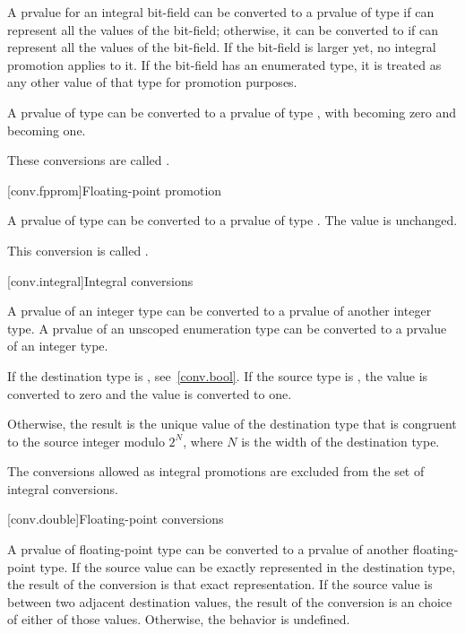 \pnum
A prvalue for an integral bit-field can be converted
to a prvalue of type  if  can represent all the
values of the bit-field; otherwise, it can be converted to
 if  can represent all the
values of the bit-field. If the bit-field is larger yet, no integral
promotion applies to it. If the bit-field has an enumerated type, it is
treated as any other value of that type for promotion purposes.

\pnum
{}%
A prvalue of type  can be converted to a prvalue of type
, with  becoming zero and  becoming
one.

\pnum
These conversions are called .

[conv.fpprom]{Floating-point promotion}

\pnum
{}%
A prvalue of type  can be converted to a prvalue of type
. The value is unchanged.

\pnum
This conversion is called .

[conv.integral]{Integral conversions}

\pnum
{}%
A prvalue of an integer type can be converted to a prvalue of another
integer type. A prvalue of an unscoped enumeration type can be converted to
a prvalue of an integer type.

\pnum
{}%
If the destination type is , see~\ref{conv.bool}. If the
source type is , the value  is converted to
zero and the value  is converted to one.

\pnum
{}%
%
Otherwise, the result is the unique value of the destination type
that is congruent to the source integer modulo $2^N$,
where $N$ is the width of the destination type.

\pnum
The conversions allowed as integral promotions are excluded from the set
of integral conversions.

[conv.double]{Floating-point conversions}

\pnum
{}%
A prvalue of floating-point type can be converted to a prvalue of
another floating-point type. If the source value can be exactly
represented in the destination type, the result of the conversion is
that exact representation. If the source value is between two adjacent
destination values, the result of the conversion is an
 choice of either of those values.
Otherwise, the behavior is undefined.

